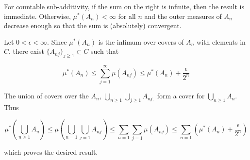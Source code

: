 \documentclass{article}
\begin{document}
For countable sub-additivity, if the sum on the right is infinite, then the result is immediate. Otherwise, $\mu^*(A_n) < \infty$ for all $n$ and the outer measures of $A_n$ decrease enough so that the sum is (absolutely) convergent.

Let $0 < \epsilon < \infty$. Since $\mu^*(A_n)$ is the infimum over covers of $A_n$ with elements in $C$, there exist $\{A_{nj}\}_{j \geq 1} \subset C$ such that

\[
\mu^*(A_n) \leq \sum_{j=1}^\infty \mu(A_{nj}) \leq \mu^*(A_n) + \frac{\epsilon}{2^n}
\]

The union of covers over the $A_n$, $\bigcup_{n \geq 1} \bigcup_{j \geq 1} A_{nj,}$ form a cover for $\bigcup_{n \geq 1} A_n$. Thus

\[
\mu^*\left( \bigcup_{n \geq 1} A_n \right) \leq
\mu\left( \bigcup_{n=1}\bigcup_{j=1} A_{nj} \right)
\leq \sum_{n=1}\sum_{j=1} \mu(A_{nj}) \leq \sum_{n=1}\left(\mu^*(A_n) + \frac{\epsilon}{2^n}\right)
\]

which proves the desired result.
\end{document}
